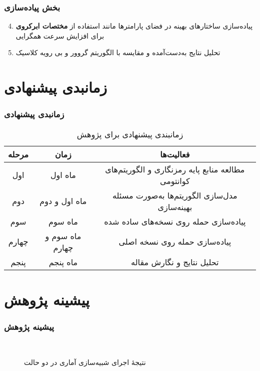 \documentclass[xcolor=dvipsnames, professionalfonts, aspectratio=169, 11pt]{beamer}
\begin{document}
\begin{frame}
    \frametitle{بخش پیاده‌سازی}
    \begin{enumerate}
        \setcounter{enumi}{3}
        \item پیاده‌سازی ساختارهای بهینه در فضای پارامترها مانند استفاده از \textbf{مختصات ابرکروی} برای افزایش سرعت همگرایی
        \item تحلیل نتایج به‌دست‌آمده و مقایسه با الگوریتم گروور و بی رویه کلاسیک
    \end{enumerate}
\end{frame}

\section{زمانبدی پیشنهادی}
\begin{frame}
    \frametitle{زمانبدی پیشنهادی}
    \begin{table}
        \caption{زمانبندی پیشنهادى براى پژوهش}
        \vspace{-1em}
        \small
        \begin{tabular}{|c|c|c|}
            \hline
            \textbf{مرحله} & \textbf{زمان} & \textbf{فعالیت‌ها} \\
            \hline
            اول & ماه اول & مطالعه منابع پایه رمزنگارى و الگوریتم‌هاى کوانتومى \\
            \hline
            دوم & ماه اول و دوم & مدل‌سازى الگوریتم‌ها به‌صورت مسئله بهینه‌سازى \\
            \hline
            سوم & ماه سوم & پیاده‌سازى حمله روى نسخه‌هاى ساده شده \\
            \hline
            چهارم & ماه سوم و چهارم & پیاده‌سازى حمله روى نسخه اصلى \\
            \hline
            پنجم & ماه پنجم & تحلیل نتایج و نگارش مقاله \\
            \hline
        \end{tabular}
    \end{table}
\end{frame}

\section{پیشینه پژوهش}
\begin{frame}[noframenumbering]
    \frametitle{پیشینه پژوهش}

    \begin{figure}[htb]
        \centering
        \
        \caption{نتیجهٔ اجرای شبیه‌سازی آماری در دو حالت}
        \label{fig:ode-sais}
    \end{figure}

\end{frame}
\end{document}
